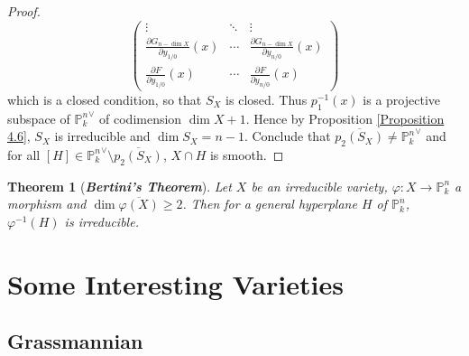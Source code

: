 \documentclass{ctexart}
\newtheorem{theorem}{Theorem}[section]
\begin{document}
\begin{proof}
\begin{equation}
\begin{pmatrix}
            \vdots & \ddots & \vdots \\
            \frac{\partial G_{n - \dim X}}{\partial y_{1/0}}(x) & \cdots & \frac{\partial G_{n - \dim X}}{\partial y_{n/0}}(x) \\
            \frac{\partial F}{\partial y_{1/0}}(x) & \cdots & \frac{\partial F}{\partial y_{n/0}}(x)
        \end{pmatrix}
    \end{equation}
    which is a closed condition, so that $S_{X}$ is closed.
    Thus $p_{1}^{-1}(x)$ is a projective subspace of ${\mathbb{P}_{k}^{n}}^{\vee}$ of codimension $\dim X + 1$.
    Hence by Proposition \ref{Proposition 4.6}, $S_{X}$ is irreducible and $\dim S_{X} = n - 1$.
    Conclude that $\overline{p_{2}(S_{X})} \neq {\mathbb{P}_{k}^{n}}^{\vee}$ and for all $[H]\in {\mathbb{P}_{k}^{n}}^{\vee} \setminus \overline{p_{2}(S_{X})}$, $X \cap H$ is smooth.
\end{proof}
\begin{theorem}[\textbf{\emph{Bertini's Theorem}}]
    Let $X$ be an irreducible variety, $\varphi: X \rightarrow \mathbb{P}_{k}^{n}$ a morphism and $\dim \overline{\varphi(X)} \ge 2$.
    Then for a general hyperplane $H$ of $\mathbb{P}_{k}^{n}$, $\varphi^{-1}(H)$ is irreducible.
    \label{Theorem 5.7}
\end{theorem}

\section{Some Interesting Varieties}
\label{section:Some_Interesting_Varieties}

\subsection{Grassmannian}
\label{subsection:Some_Interesting_Varieties_Grassmannian}
\end{document}
